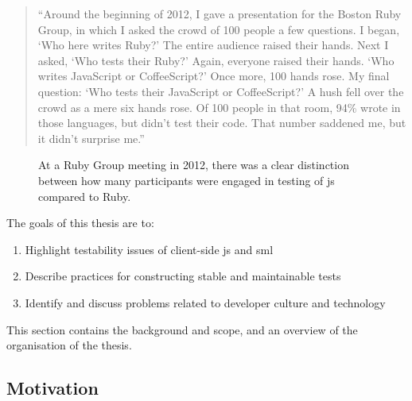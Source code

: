 \documentclass[11pt]{article}
\begin{document}
\begin{quote}
``Around the beginning of 2012, I gave a presentation for the Boston Ruby Group, in which I asked the crowd of 100 people a few questions. I began, `Who here writes Ruby?' The entire audience raised their hands. Next I asked, `Who tests their Ruby?' Again, everyone raised their hands. `Who writes JavaScript or CoffeeScript?' Once more, 100 hands rose. My final question: `Who tests their JavaScript or CoffeeScript?' A hush fell over the crowd as a mere six hands rose. Of 100 people in that room, 94\% wrote in those languages, but didn't test their code. That number saddened me, but it didn't surprise me.''
\end{quote}

\begin{figure}
\centering
{}
\caption{At a Ruby Group meeting in 2012, there was a clear distinction between how many participants were engaged in testing of \gls{js} compared to Ruby.}
\label{fig:jsruby}
\end{figure}

\newpage

The goals of this thesis are to:

\begin{enumerate}
\item Highlight testability issues of client-side \gls{js} and \gls{sml}
\item Describe practices for constructing stable and maintainable tests
\item Identify and discuss problems related to developer culture and technology
\end{enumerate}

This section contains the background and scope, and an overview of the organisation of the thesis.

\subsection{Motivation}
\label{subsec:motivation}
\end{document}
